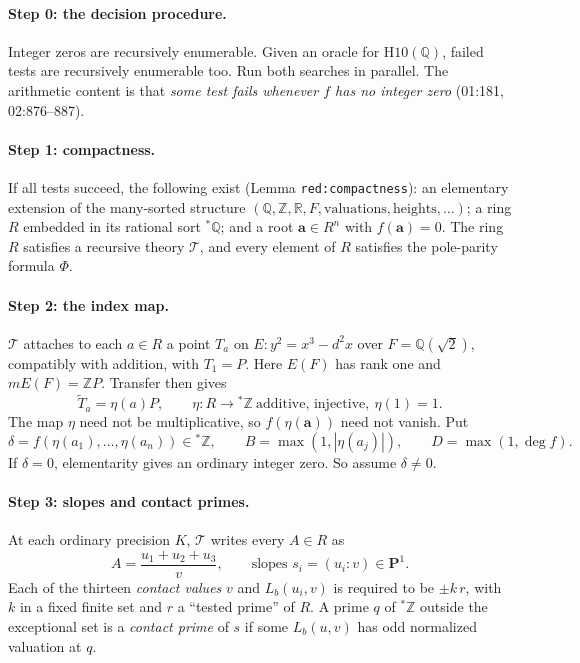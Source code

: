 \documentclass[11pt]{article}
\theoremstyle{definition}
\newcommand{\Q}{\mathbb Q}
\newcommand{\Z}{\mathbb Z}
\newcommand{\R}{\mathbb R}
\newcommand{\PP}{\mathbf P}
\newcommand{\sZ}{{}^*\Z}
\newcommand{\sQ}{{}^*\Q}
\newcommand{\lbl}[1]{\texttt{#1}}
\newcommand{\src}[1]{\textsf{#1}}
\begin{document}
\paragraph{Step 0: the decision procedure.}
Integer zeros are recursively enumerable.  Given an oracle for
$\mathrm{H10}(\Q)$, failed tests are recursively enumerable too.  Run both
searches in parallel.  The arithmetic content is that \emph{some test fails
whenever $f$ has no integer zero} (\src{01:181}, \src{02:876--887}).

\paragraph{Step 1: compactness.}
If all tests succeed, the following exist (Lemma \lbl{red:compactness}):
an elementary extension of the many-sorted structure
$(\Q,\Z,\R,F,\text{valuations},\text{heights},\dots)$; a ring $R$ embedded
in its rational sort $\sQ$; and a root $\mathbf a\in R^n$ with
$f(\mathbf a)=0$.  The ring $R$ satisfies a recursive theory $\mathcal T$,
and every element of $R$ satisfies the pole-parity formula $\Phi$.

\paragraph{Step 2: the index map.}
$\mathcal T$ attaches to each $a\in R$ a point $T_a$ on
$E:y^2=x^3-d^2x$ over $F=\Q(\sqrt2)$, compatibly with addition, with
$T_1=P$.  Here $E(F)$ has rank one and $mE(F)=\Z P$.  Transfer then gives
\[
 \widetilde T_a=\eta(a)P,\qquad \eta:R\to\sZ\ \text{additive, injective},\
 \eta(1)=1.
\]
The map $\eta$ need not be multiplicative, so $f(\eta(\mathbf a))$ need not
vanish.  Put
\[
 \delta=f(\eta(a_1),\dots,\eta(a_n))\in\sZ,\qquad
 B=\max(1,|\eta(a_j)|),\qquad D=\max(1,\deg f).
\]
If $\delta=0$, elementarity gives an ordinary integer zero.  So assume
$\delta\neq0$.

\paragraph{Step 3: slopes and contact primes.}
At each ordinary precision $K$, $\mathcal T$ writes every $A\in R$ as
\[
 A=\frac{u_1+u_2+u_3}{v},\qquad \text{slopes } s_i=(u_i:v)\in\PP^1.
\]
Each of the thirteen \emph{contact values} $v$ and $L_b(u_i,v)$ is required
to be $\pm k\,r$, with $k$ in a fixed finite set and $r$ a ``tested prime''
of $R$.  A prime $q$ of $\sZ$ outside the exceptional set is a
\emph{contact prime} of $s$ if some $L_b(u,v)$ has odd normalized
valuation at $q$.
\end{document}
